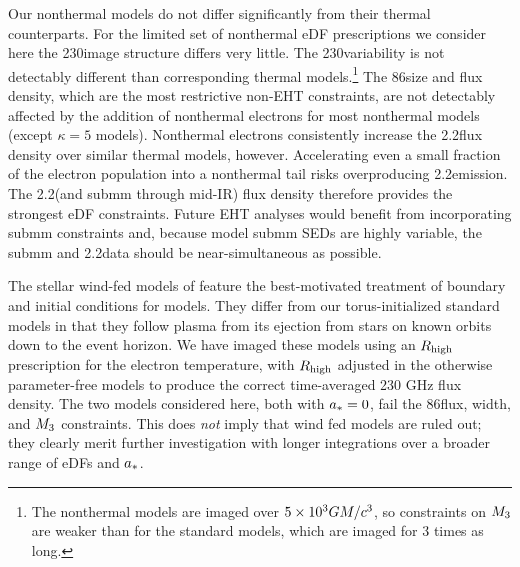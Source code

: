 Our nonthermal models do not differ significantly from their thermal counterparts.
For the limited set of nonthermal eDF prescriptions we consider here the 230\GHz image structure differs very little.
The 230\GHz variability is not detectably different than corresponding thermal models.\footnote{The nonthermal models are imaged over $5\times 10^3GM/c^3$, so constraints on $M_{3}$ are weaker than for the standard models, which are imaged for 3 times as long.}
The 86\GHz size and flux density, which are the most restrictive non-EHT constraints, are not detectably affected by the addition of nonthermal electrons for most nonthermal models (except $\kappa = 5$ models).
Nonthermal electrons consistently increase the 2.2\um flux density over similar thermal models, however.
Accelerating even a small fraction of the electron population into a nonthermal tail risks overproducing 2.2\um emission.
The 2.2\um (and submm through mid-IR) flux density therefore provides the strongest eDF constraints.
Future EHT analyses would benefit from incorporating submm constraints \citep[e.g.]{2019ApJ...881L...2B} and, because model submm SEDs are highly variable, the submm and 2.2\um data should be near-simultaneous as possible.

The stellar wind-fed models of \cite{2020ApJ...896L...6R} feature the best-motivated treatment of boundary and initial conditions for \sgra models.  They differ from our torus-initialized standard models in that they follow plasma from its ejection from stars on known orbits down to the event horizon.  We have imaged these models using an $R_\mathrm{high}$ prescription for the electron temperature, with $R_\mathrm{high}$ adjusted in the otherwise parameter-free models to produce the correct time-averaged 230 GHz flux density.  The two models considered here, both with $a_* = 0$, fail the 86\GHz flux, \mring width, and $M_{3}$ constraints.  This does {\em not} imply that wind fed models are ruled out; they clearly merit further investigation with longer integrations over a broader range of eDFs and $a_*$.

